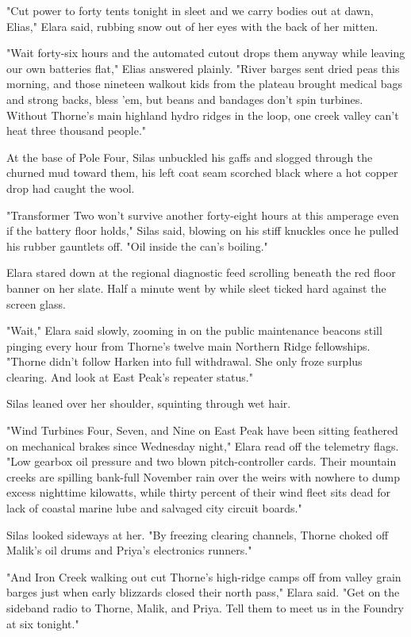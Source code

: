 "Cut power to forty tents tonight in sleet and we carry bodies out at dawn, Elias," Elara said, rubbing snow out of her eyes with the back of her mitten.

"Wait forty-six hours and the automated cutout drops them anyway while leaving our own batteries flat," Elias answered plainly. "River barges sent dried peas this morning, and those nineteen walkout kids from the plateau brought medical bags and strong backs, bless 'em, but beans and bandages don't spin turbines. Without Thorne's main highland hydro ridges in the loop, one creek valley can't heat three thousand people."

At the base of Pole Four, Silas unbuckled his gaffs and slogged through the churned mud toward them, his left coat seam scorched black where a hot copper drop had caught the wool.

"Transformer Two won't survive another forty-eight hours at this amperage even if the battery floor holds," Silas said, blowing on his stiff knuckles once he pulled his rubber gauntlets off. "Oil inside the can's boiling."

Elara stared down at the regional diagnostic feed scrolling beneath the red floor banner on her slate. Half a minute went by while sleet ticked hard against the screen glass.

"Wait," Elara said slowly, zooming in on the public maintenance beacons still pinging every hour from Thorne's twelve main Northern Ridge fellowships. "Thorne didn't follow Harken into full withdrawal. She only froze surplus clearing. And look at East Peak's repeater status."

Silas leaned over her shoulder, squinting through wet hair.

"Wind Turbines Four, Seven, and Nine on East Peak have been sitting feathered on mechanical brakes since Wednesday night," Elara read off the telemetry flags. "Low gearbox oil pressure and two blown pitch-controller cards. Their mountain creeks are spilling bank-full November rain over the weirs with nowhere to dump excess nighttime kilowatts, while thirty percent of their wind fleet sits dead for lack of coastal marine lube and salvaged city circuit boards."

Silas looked sideways at her. "By freezing clearing channels, Thorne choked off Malik's oil drums and Priya's electronics runners."

"And Iron Creek walking out cut Thorne's high-ridge camps off from valley grain barges just when early blizzards closed their north pass," Elara said. "Get on the sideband radio to Thorne, Malik, and Priya. Tell them to meet us in the Foundry at six tonight."

